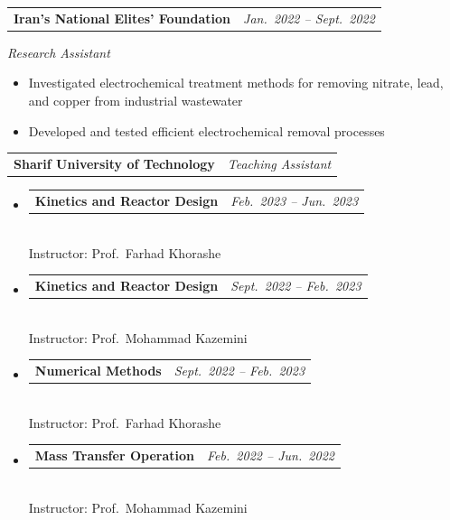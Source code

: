 \documentclass[10pt, a4paper]{article}
\makeatletter
\newcommand{\cvsection}[1]{%
  \vspace{9pt}%
  \noindent{\normalfont\bfseries\normalsize\color{NavyPrimary}%
    \MakeUppercase{#1}}%
  \vspace{0pt}\par\vspace{-2pt}%
  \noindent{\color{NavyPrimary}\rule{\linewidth}{0.7pt}}%
  \vspace{4pt}\par
}
\newcommand{\entrysep}{\vspace{3pt}}
\newcommand{\entryheader}[2]{%
  \noindent
  \begin{tabularx}{\linewidth}{@{}X r@{}}
    \textbf{\color{NavyPrimary}#1} & \textit{\small\color{NavyMid}#2}
  \end{tabularx}%
  \par\vspace{1pt}%
}
\newcommand{\entrysub}[1]{%
  {\small\itshape #1}\par\vspace{1pt}%
}
\makeatother
\begin{document}
\entrysep

\entryheader{Iran's National Elites' Foundation}{Jan.\ 2022 -- Sept.\ 2022}
\entrysub{Research Assistant}
\begin{itemize}
  \item Investigated electrochemical treatment methods for removing nitrate,
        lead, and copper from industrial wastewater
  \item Developed and tested efficient electrochemical removal processes
\end{itemize}

\entrysep

\entryheader{Sharif University of Technology}{Teaching Assistant}
\begin{itemize}
  \item \begin{tabularx}{\linewidth}{@{}X r@{}}
      \textbf{Kinetics and Reactor Design} & \textit{\small\color{NavyMid}Feb.\ 2023 -- Jun.\ 2023}
    \end{tabularx}\vspace{-2pt}\\
    {\small Instructor: Prof.\ Farhad Khorashe}
  \item \begin{tabularx}{\linewidth}{@{}X r@{}}
      \textbf{Kinetics and Reactor Design} & \textit{\small\color{NavyMid}Sept.\ 2022 -- Feb.\ 2023}
    \end{tabularx}\vspace{-2pt}\\
    {\small Instructor: Prof.\ Mohammad Kazemini}
  \item \begin{tabularx}{\linewidth}{@{}X r@{}}
      \textbf{Numerical Methods} & \textit{\small\color{NavyMid}Sept.\ 2022 -- Feb.\ 2023}
    \end{tabularx}\vspace{-2pt}\\
    {\small Instructor: Prof.\ Farhad Khorashe}
  \item \begin{tabularx}{\linewidth}{@{}X r@{}}
      \textbf{Mass Transfer Operation} & \textit{\small\color{NavyMid}Feb.\ 2022 -- Jun.\ 2022}
    \end{tabularx}\vspace{-2pt}\\
    {\small Instructor: Prof.\ Mohammad Kazemini}
\end{itemize}

\cvsection{Publications}
\end{document}
